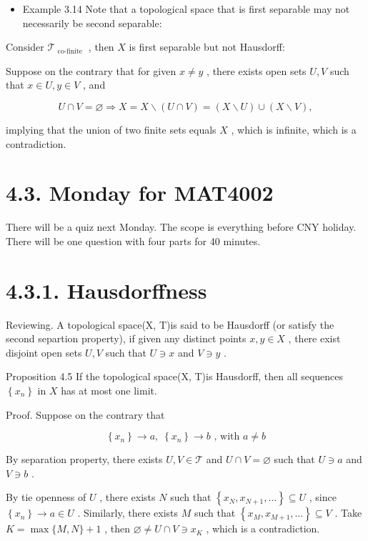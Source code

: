 \begin{itemize}
\item Example 3.14 Note that a topological space that is first separable may not necessarily be second separable:
\end{itemize}

Consider \({\mathcal{T}}_{\text{ co-finite }}\) , then \(X\) is first separable but not Hausdorff:

Suppose on the contrary that for given \(x \neq  y\) , there exists open sets \(U,V\) such that \(x \in  U,y \in  V\) , and

\[
U \cap  V = \varnothing  \Rightarrow  X = X \smallsetminus  \left( {U \cap  V}\right)  = \left( {X \smallsetminus  U}\right)  \cup  \left( {X \smallsetminus  V}\right) ,
\]

implying that the union of two finite sets equals \(X\) , which is infinite, which is a contradiction.

\section*{4.3. Monday for MAT4002}

There will be a quiz next Monday. The scope is everything before CNY holiday. There will be one question with four parts for 40 minutes.

\section*{4.3.1. Hausdorffness}

Reviewing. A topological space(X, T)is said to be Hausdorff (or satisfy the second separtion property), if given any distinct points \(x,y \in  X\) , there exist disjoint open sets \(U,V\) such that \(U \ni  x\) and \(V \ni  y\) .

Proposition 4.5 If the topological space(X, T)is Hausdorff, then all sequences \(\left\{  {x}_{n}\right\}\) in \(X\) has at most one limit.

Proof. Suppose on the contrary that

\[
\left\{  {x}_{n}\right\}   \rightarrow  a,\;\left\{  {x}_{n}\right\}   \rightarrow  b\text{ , with }a \neq  b
\]

By separation property, there exists \(U,V \in  \mathcal{T}\) and \(U \cap  V = \varnothing\) such that \(U \ni  a\) and \(V \ni  b\) .

By tie openness of \(U\) , there exists \(N\) such that \(\left\{  {{x}_{N},{x}_{N + 1},\ldots }\right\}   \subseteq  U\) , since \(\left\{  {x}_{n}\right\}   \rightarrow  a \in  U\) . Similarly, there exists \(M\) such that \(\left\{  {{x}_{M},{x}_{M + 1},\ldots }\right\}   \subseteq  V\) . Take \(K = \max \{ M,N\}  + 1\) , then \(\varnothing  \neq  U \cap  V \ni  {x}_{K}\) , which is a contradiction.

